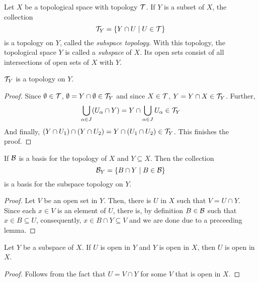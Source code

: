 \begin{definition}
    Let $X$ be a topological space with topology $\mathcal{T}$. If $Y$ is a subset of $X$, the collection 
    \begin{equation*}
        \mathcal{T}_Y = \{Y\cap U\mid U\in\mathcal{T}\}
    \end{equation*}
    is a topology on $Y$, called the \textit{subspace topology}. With this topology, the topological space $Y$ is called a \textit{subspace} of $X$. Its open sets consist of all intersections of open sets of $X$ with $Y$.
\end{definition}

\begin{proposition}
    $\mathcal{T}_Y$ is a topology on $Y$.
\end{proposition}
\begin{proof}
    Since $\emptyset\in\mathcal{T}$, $\emptyset = Y\cap\emptyset\in\mathcal{T}_Y$ and since $X\in\mathcal{T}$, $Y = Y\cap X\in\mathcal{T}_Y$. Further, 
    \begin{equation*}
        \bigcup_{\alpha\in J}(U_\alpha\cap Y) = Y\cap\bigcup_{\alpha\in J}U_\alpha\in\mathcal{T}_Y
    \end{equation*}
    And finally, $(Y\cap U_1)\cap(Y\cap U_2) = Y\cap(U_1\cap U_2)\in\mathcal{T}_Y$. This finishes the proof.
\end{proof}

\begin{lemma}
    If $\mathcal{B}$ is a basis for the topology of $X$ and $Y\subseteq X$. Then the collection 
    \begin{equation*}
        \mathcal{B}_Y = \{B\cap Y\mid B\in\mathcal{B}\}
    \end{equation*}
    is a basis for the subspace topology on $Y$.
\end{lemma}
\begin{proof}
    Let $V$ be an open set in $Y$. Then, there is $U$ in $X$ such that $V = U\cap Y$. Since each $x\in V$ is an element of $U$, there is, by definition $B\in\mathcal{B}$ such that $x\in B\subseteq U$, consequently, $x\in B\cap Y\subseteq V$ and we are done due to a preceeding lemma.
\end{proof}

\begin{proposition}
    Let $Y$ be a subspace of $X$. If $U$ is open in $Y$ and $Y$ is open in $X$, then $U$ is open in $X$.
\end{proposition}
\begin{proof}
    Follows from the fact that $U = V\cap Y$ for some $V$ that is open in $X$.
\end{proof}

